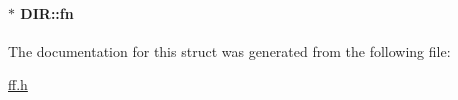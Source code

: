 \paragraph[{fn}]{$\ast$ D\+I\+R\+::fn}\label{struct_d_i_r_a32da2f31d6c3b6c42eef981cb0cfd2ee}


The documentation for this struct was generated from the following file\+:\begin{DoxyCompactItemize}
\item 
\hyperlink{ff_8h}{ff.\+h}\end{DoxyCompactItemize}

